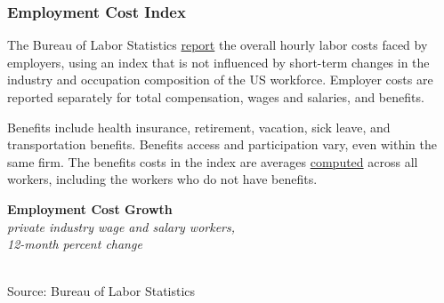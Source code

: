\documentclass{report}
\makeatletter
\newcommand{\tbllink}[1]{\href{https://raw.githubusercontent.com/bdecon/US-chartbook/master/chartbook/data/#1}{\faTable}}
\newcommand*\short[1]{\expandafter\@gobbletwo\number\numexpr#1\relax}
\newcommand{\absnode}[3]{\node[below right, align=left] at (axis cs: #1,#2) {#3};}
\newcommand{\dateaxisticks}{
		date coordinates in=x, axis line style={draw=none},
		xmax={2023-10-01},
		max space between ticks=40,	    
		xtick={{1990-01-01}, {1992-01-01}, {1994-01-01}, 
			{1996-01-01}, {1998-01-01}, {2000-01-01}, 
			{2002-01-01}, {2004-01-01}, {2006-01-01},
			{2008-01-01}, {2010-01-01}, {2012-01-01}, {2014-01-01},
		    {2016-01-01}, {2018-01-01}, {2020-01-01}, {2022-01-01}, 
		    {2024-01-01}, {2026-01-01}},
		minor xtick={{1989-01-01}, {1991-01-01}, {1993-01-01},
			{1995-01-01}, {1997-01-01}, {1999-01-01}, 
			{2001-01-01}, {2003-01-01}, {2005-01-01}, {2007-01-01},
		    {2009-01-01}, {2011-01-01}, {2013-01-01}, {2015-01-01},
		    {2017-01-01}, {2019-01-01}, {2021-01-01}, {2023-01-01}, 
		    {2025-01-01}, {2027-01-01}},
		enlarge y limits={0.06}, enlarge x limits={0.01},
		}
\newcommand{\bbar}[2]{extra #1 ticks = {{#2}}, extra #1 tick labels = ,
		extra #1 tick style = {grid=major, grid style={thick, black!25}},}
\newcommand{\stdline}[4]{\addplot[very thick, no markers, color=#1] 
		table [x=#2, y=#3, col sep=comma] {#4};	}
\newcommand{\rebars}{
		\fill[color=black!10] (axis cs:{2007-12-01},\pgfkeysvalueof{/pgfplots/ymin}) rectangle 
			(axis cs:{2009-07-01}, \pgfkeysvalueof{/pgfplots/ymax});
		\fill[color=black!10] (axis cs:{2001-03-01},\pgfkeysvalueof{/pgfplots/ymin}) rectangle 
			(axis cs:{2001-11-01}, \pgfkeysvalueof{/pgfplots/ymax});
		\fill[color=black!10] (axis cs:{2020-02-01},\pgfkeysvalueof{/pgfplots/ymin}) rectangle 
			(axis cs:{2020-05-01}, \pgfkeysvalueof{/pgfplots/ymax});}
\makeatother
\begin{document}
{\begin{minipage}{0.76\textwidth}
\subsubsection*{Employment Cost Index}
\small The Bureau of Labor Statistics \href{https://www.bls.gov/news.release/eci.nr0.htm}{report} the overall hourly labor costs faced by employers, using an index that is not influenced by short-term changes in the industry and occupation composition of the US workforce. Employer costs are reported separately for total compensation, wages and salaries, and benefits.

Benefits include health insurance, retirement, vacation, sick leave, and transportation benefits. Benefits access and participation vary, even within the same firm. The benefits costs in the index are averages \href{https://www.bls.gov/opub/mlr/cwc/benefit-cost-concepts-and-the-limitations-of-ecec-measurement.pdf}{computed} across all workers, including the workers who do not have benefits. 
\end{minipage}

\begin{minipage}{0.41\textwidth}
\normalsize \textbf{Employment Cost Growth}\\
\footnotesize{\textit{private industry wage and salary workers,}}\\
\footnotesize{\textit{12-month percent change}}\\
\hspace*{-2mm} \\
\footnotesize{Source: Bureau of Labor Statistics} \hfill \tbllink{eci.csv}
\end{minipage} \hspace{6mm} \begin{minipage}{0.3\textwidth}
\small 
\end{minipage}
\newpage
\begin{minipage}{0.76\textwidth}   

\end{minipage}}
\end{document}
